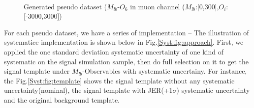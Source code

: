 		\begin{figure}[H]
		\centering
			\\
		\caption{Generated pseudo dataset ($M_{lb}$-$O_6$ in muon channel ($M_{lb}$:[0,300],$O_i$:[-3000,3000])}
		\label{Syst:fig:PD}
		\end{figure}
		\FloatBarrier

		For each pseudo dataset, we have a series of implementation -- The illustration of systematice implementation is shown below in Fig.\ref{Syst:fig:approach}. First, we applied the one standard deviation systematic uncertainty of one kind of systematic on the signal simulation sample, then do full selection on it to get the signal template under $M_{lb}$-Observables with systematic uncertainy. For instance, the Fig.\ref{Syst:fig:template} shows the signal template without any systematic uncertainty(nominal), the signal template with JER(+1$\sigma$) systematic uncertainty and the original background template.

